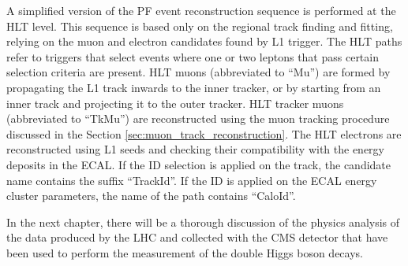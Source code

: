 A simplified version of the PF event reconstruction sequence is performed at the HLT level. This sequence is based only on the regional track finding and fitting, relying on the muon and electron candidates found by L1 trigger. The HLT paths refer to triggers that select events where one or two leptons that pass certain selection criteria are present. HLT muons (abbreviated to ``Mu'') are formed by propagating the L1 track inwards to the inner tracker, or by starting from an inner track and projecting it to the outer tracker. HLT tracker muons (abbreviated to ``TkMu'') are reconstructed using the muon tracking procedure discussed in the Section \ref{sec:muon_track_reconstruction}. The HLT electrons are reconstructed using L1 seeds and checking their compatibility with the energy deposits in the ECAL. If the ID selection is applied on the track, the candidate name contains the suffix ``TrackId''. If the ID is applied on the ECAL energy cluster parameters, the name of the path contains ``CaloId''.


In the next chapter, there will be a thorough discussion of the physics analysis of the data produced by the LHC and collected with the CMS detector that have been used to perform the measurement of the double Higgs boson decays.


